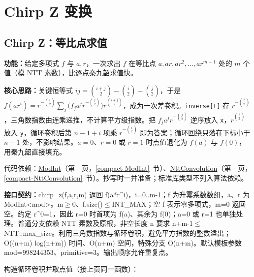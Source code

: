 \Needspace{180pt}

\section{Chirp Z 变换}

\subsection{Chirp Z：等比点求值}\label{compact-chirp_z}

\noindent\textbf{功能：}\allowbreak 给定多项式 $f$ 与 $a,r$，一次求出 $f$ 在等比点 $a,ar,ar^2,\dots,ar^{m-1}$ 处的 $m$ 个值（模 NTT 素数），比逐点秦九韶求值快。

\textbf{核心思路：}\allowbreak 关键恒等式 $ij=\binom{i+j}{2}-\binom{i}{2}-\binom{j}{2}$，于是 $f(ar^i)=r^{-\binom i2}\sum_j\bigl(f_ja^jr^{-\binom j2}\bigr)r^{\binom{i+j}{2}}$，成为一次差卷积。\texttt{inverse[t]} 存 $r^{-\binom t2}$，三角数指数由连乘递推，不计算平方级指数。把 $f_ja^jr^{-\binom j2}$ 逆序放入 \texttt{x}，$r^{\binom t2}$ 放入 \texttt{y}，循环卷积后第 $n-1+i$ 项乘 $r^{-\binom i2}$ 即为答案；循环回绕只落在下标小于 $n-1$ 处，不影响结果。$a=0$、$r=0$ 或 $r=1$ 时点值退化为 $f(a)$ 与 $f(0)$，用秦九韶直接填充。

代码依赖：\hyperref[compact-ModInt]{ModInt}（第~\pageref{compact-ModInt}~页，\ref{compact-ModInt}~节）、\hyperref[compact-NttConvolution]{NttConvolution}（第~\pageref{compact-NttConvolution}~页，\ref{compact-NttConvolution}~节）。抄写时一并准备；标准库类型不列入算法依赖。

{\sloppy{}\noindent\textbf{接口契约：}chirp\_z(f,a,r,m) 返回 f(a*r\textasciicircum{}i)，i=0..m-1；f 为升幂系数数组，a、r 为 ModInt<mod>。m$\ge$0、f.size()$\le$INT\_MAX；空 f 表示零多项式，m=0 返回空。约定 r\textasciicircum{}0=1，因此 r=0 时首项为 f(a)、其余为 f(0)；a=0 或 r=1 也单独处理。普通分支依赖 NTT 素数及原根，非空长度 n 要求 n+m-1$\le$NTT::max\_size。利用三角数指数与循环卷积，避免平方指数的整数溢出；O((n+m) log(n+m)) 时间、O(n+m) 空间，特殊分支 O(n+m)。默认模板参数 mod=998244353、primitive=3。输出顺序允许重复点。\par}

\Needspace{413pt}



\newpage

\noindent 构造循环卷积并取点值（接上页同一函数）：



